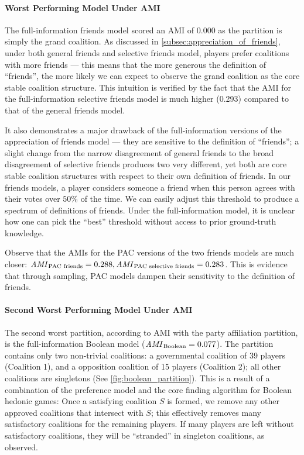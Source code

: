 \paragraph{Worst Performing Model Under AMI}
The full-information friends model scored an AMI of $0.000$ as the partition is
simply the grand coalition.
As discussed in \autoref{subsec:appreciation_of_friends}, under both general
friends and selective friends model, players prefer coalitions with more
friends --- this means that the more generous the definition of ``friends'', the
more likely we can expect to observe the grand coalition as the core stable
coalition structure.
This intuition is verified by the fact that the AMI for the full-information
selective friends model is much higher (0.293) compared to that of the general
friends model.

It also demonstrates a major drawback of the full-information versions of the
appreciation of friends model --- they are sensitive to the definition of
``friends''; a slight change from the narrow disagreement of general friends
to the broad disagreement of selective friends produces two very different, yet
both are core stable coalition structures with respect to their own definition of
friends.
In our friends models, a player considers someone a friend when this person
agrees with their votes over $50\%$ of the time.
We can easily adjust this threshold to produce a spectrum of definitions of
friends.
Under the full-information model, it is unclear how one can pick the ``best''
threshold without access to prior ground-truth knowledge.

Observe that the AMIs for the PAC versions of the two friends models are much
closer: $\mathit{AMI}_{\text{PAC friends}} = 0.288,
\mathit{AMI}_{\text{PAC selective friends}} = 0.283$.
This is evidence that through sampling, PAC models dampen their sensitivity to
the definition of friends.

\paragraph{Second Worst Performing Model Under AMI} 
The second worst partition, according to AMI with the party affiliation
partition, is the full-information Boolean model ($\mathit{AMI}_{\text{Boolean}} = 0.077$).
The partition contains only two non-trivial coalitions: a governmental coalition
of 39 players (Coalition 1), and a opposition coalition of 15 players (Coalition 2);
all other coalitions are singletons (See \autoref{fig:boolean_partition}).
This is a result of a combination of the preference model and the core finding
algorithm for Boolean hedonic games:
Once a satisfying coalition $S$ is formed, we remove any other approved
coalitions that intersect with $S$; this effectively removes many satisfactory
coalitions for the remaining players.
If many players are left without satisfactory coalitions, they will be
``stranded'' in singleton coalitions, as observed.

